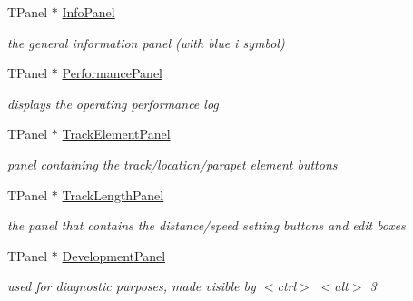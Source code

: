 \begin{DoxyCompactItemize}
\mbox{\label{class_t_interface_aa8f9a87d19b3695023f99fdc8e1c650a}} 
T\+Panel $\ast$ \mbox{\hyperlink{class_t_interface_aa8f9a87d19b3695023f99fdc8e1c650a}{Info\+Panel}}
\begin{DoxyCompactList}\small\item\em the general information panel (with blue \textquotesingle{}i\textquotesingle{} symbol) \end{DoxyCompactList}\item 
\mbox{\label{class_t_interface_a4801769eef6bace140a5fddc5edf58e6}} 
T\+Panel $\ast$ \mbox{\hyperlink{class_t_interface_a4801769eef6bace140a5fddc5edf58e6}{Performance\+Panel}}
\begin{DoxyCompactList}\small\item\em displays the operating performance log \end{DoxyCompactList}\item 
\mbox{\label{class_t_interface_a94de13b77e51b4894755d1564d812cda}} 
T\+Panel $\ast$ \mbox{\hyperlink{class_t_interface_a94de13b77e51b4894755d1564d812cda}{Track\+Element\+Panel}}
\begin{DoxyCompactList}\small\item\em panel containing the track/location/parapet element buttons \end{DoxyCompactList}\item 
\mbox{\label{class_t_interface_abc8305e8654aeac73f905b3fa8f9eb7b}} 
T\+Panel $\ast$ \mbox{\hyperlink{class_t_interface_abc8305e8654aeac73f905b3fa8f9eb7b}{Track\+Length\+Panel}}
\begin{DoxyCompactList}\small\item\em the panel that contains the distance/speed setting buttons and edit boxes \end{DoxyCompactList}\item 
\mbox{\label{class_t_interface_a82ceb0b38e171d2b46c19f76afef35c1}} 
T\+Panel $\ast$ \mbox{\hyperlink{class_t_interface_a82ceb0b38e171d2b46c19f76afef35c1}{Development\+Panel}}
\begin{DoxyCompactList}\small\item\em used for diagnostic purposes, made visible by $<$ctrl$>$ $<$alt$>$ \textquotesingle{}3\textquotesingle{} \end{DoxyCompactList}\item 

\end{DoxyCompactItemize}
